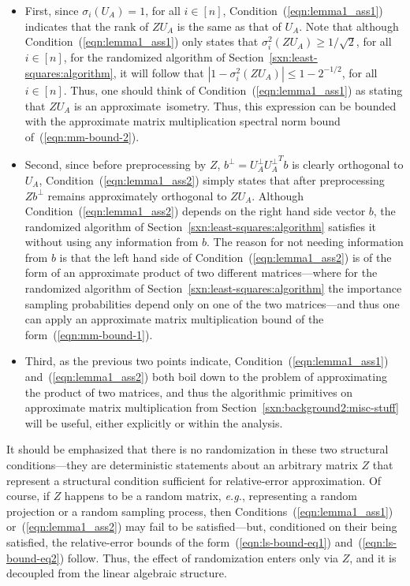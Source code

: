 \documentclass[twoside]{article}
\begin{document}
\begin{itemize}
\item
First, since $\sigma_i(U_A)=1$, for all $i \in [n]$, 
Condition~(\ref{eqn:lemma1_ass1}) indicates that the rank of $ZU_A$ is the
same as that of $U_A$.
Note that although Condition~(\ref{eqn:lemma1_ass1}) only states that 
$\sigma_i^2(ZU_A)\geq 1/\sqrt{2}$, for all $i \in [n]$, for the randomized 
algorithm of Section~\ref{sxn:least-squares:algorithm}, it will follow that 
$\left|1-\sigma_i^2(ZU_A)\right| \le 1-2^{-1/2}$, for all $i \in [n]$.
Thus, one should think of Condition~(\ref{eqn:lemma1_ass1}) as stating 
that $ZU_A$ is an approximate~isometry. 
Thus, this expression can be bounded with the approximate matrix multiplication 
spectral norm bound of~(\ref{eqn:mm-bound-2}).
\item
Second, since before preprocessing by $Z$, 
$b^{\perp}=U_A^{\perp}{U_A^{\perp}}^{T}b$ is clearly orthogonal to $U_A$, 
Condition~(\ref{eqn:lemma1_ass2}) simply states that after preprocessing
$Zb^{\perp}$ remains approximately orthogonal
to $ZU_A$. 
Although Condition~(\ref{eqn:lemma1_ass2}) depends on the right hand 
side vector $b$, the randomized algorithm of 
Section~\ref{sxn:least-squares:algorithm} satisfies it without using any 
information from $b$.
The reason for not needing information from $b$ is that the left hand side 
of Condition~(\ref{eqn:lemma1_ass2}) is of the form of an approximate 
product of two different matrices---where for the randomized algorithm of
Section~\ref{sxn:least-squares:algorithm} the importance sampling 
probabilities depend only on one of the two matrices---and thus one can apply an
approximate matrix multiplication bound of the form~(\ref{eqn:mm-bound-1}).
\item
Third, as the previous two points indicate, 
Condition~(\ref{eqn:lemma1_ass1}) and~(\ref{eqn:lemma1_ass2}) 
both boil down to the problem of approximating the product of two matrices,
and thus the algorithmic primitives on approximate matrix multiplication 
from Section~\ref{sxn:background2:misc-stuff} will be useful, either 
explicitly or within the analysis.
\end{itemize}
It should be emphasized that there is no randomization in these two 
structural conditions---they are 
deterministic statements about an arbitrary matrix $Z$ that represent a 
structural condition sufficient for relative-error approximation.
Of course, if $Z$ happens to be a random matrix, \emph{e.g.}, representing 
a random projection or a random sampling process, then 
Conditions~(\ref{eqn:lemma1_ass1}) or~(\ref{eqn:lemma1_ass2}) may fail to 
be satisfied---but, conditioned on their being satisfied, the 
relative-error bounds of the form~(\ref{eqn:ls-bound-eq1}) 
and~(\ref{eqn:ls-bound-eq2}) follow.
Thus, the effect of randomization enters only via $Z$, and it is decoupled 
from the linear algebraic structure. 
\end{document}
